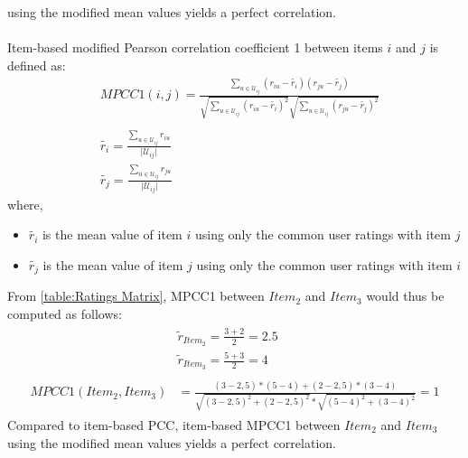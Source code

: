 using the modified mean values yields a perfect correlation.\\\\
Item-based modified Pearson correlation coefficient 1 between items $i$ and $j$ is defined as:
\begin{equation}
	\begin{split}
	&MPCC1(i,j) = \frac{\sum_{u \in \mathcal{U}_{ij}}(r_{iu}-\tilde{r_{i}})(r_{ju}-\tilde{r_{j}})}
					 {\sqrt{\sum_{u \in \mathcal{U}_{ij}}(r_{iu}-\tilde{r_{i}})^2}
					  \sqrt{\sum_{u \in \mathcal{U}_{ij}}(r_{ju}-\tilde{r_{j}})^2}} \\\\
	&\tilde{r_{i}} = \frac{\sum_{u \in \mathcal{U}_{ij}}r_{iu}}
						{\mathopen|\mathcal{U}_{ij}\mathclose|}\\
	&\tilde{r_{j}} = \frac{\sum_{u \in \mathcal{U}_{ij}}r_{ju}}
						{\mathopen|\mathcal{U}_{ij}\mathclose|}
\end{split}
\end{equation}
where,
\begin{itemize}
	\item[] $\tilde{r_i}$ is the mean value of item $i$ using only the common user ratings with item $j$
	\item[] $\tilde{r_j}$ is the mean value of item $j$ using only the common user ratings with item $i$
\end{itemize}
From \autoref{table:Ratings Matrix}, MPCC1
between $Item_2$ and $Item_3$ would thus be computed as follows:
\begin{align*}
	\begin{split}
		&\tilde{r}_{Item_2} = \frac{3 + 2}{2} = 2.5\\
		&\tilde{r}_{Item_3} = \frac{5 + 3}{2} = 4\\\\
		MPCC1(Item_2,Item_3) &= \frac{(3 - 2,5) * (5 - 4) + (2 - 2,5) * (3 - 4)}
								  {\sqrt{(3 - 2,5)^2 + (2 - 2,5)^2} *
								   \sqrt{(5 - 4)^2 + (3 - 4)^2}} = 1
	\end{split}
\end{align*}
Compared to item-based PCC, item-based MPCC1 between $Item_2$ and $Item_3$
using the modified mean values yields a perfect correlation.
